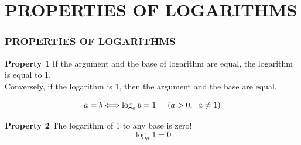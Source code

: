 \documentclass[xcolor=dvipsnames]{beamer}
\begin{document}
\section{ PROPERTIES OF LOGARITHMS}

\begin{frame}
\frametitle{ PROPERTIES OF LOGARITHMS  } 
\begin{alertblock}{\textbf{Property 1}}
If the argument and the base of logarithm are equal, the logarithm is equal to 1. \\ Conversely, if the logarithm is 1, then the argument and the base are equal.

$$a = b \Longleftrightarrow \log_{a}b = 1 \hspace{0.5 cm}(a>0, \hspace{0.2 cm}a\ne 1 ) $$
   
\end{alertblock}
\begin{alertblock}{\textbf{Property 2}}
The logarithm of $1$ to any base is zero!
$$  \log_{a}1 = 0$$
\end{alertblock}
\end{frame}
\end{document}
